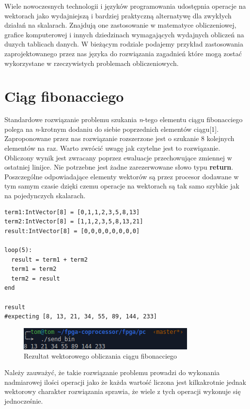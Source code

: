 Wiele nowoczesnych technologii i języków programowania udostępnia operacje na wektorach jako wydajniejszą i bardziej praktyczną alternatywę dla zwykłych działań na skalarach. Znajdują one zastosowanie w matematyce obliczeniowej, grafice komputerowej i innych dziedzinach wymagających wydajnych obliczeń na duzych tablicach danych. W bieżącym rodziale podajemy przykład zastosowania zaprojektowanego przez nas języka do rozwiązania zagadnień które mogą zostać wykorzystane w rzeczywistych problemach obliczeniowych.
\section{Ciąg fibonacciego}
Standardowe rozwiązanie problemu szukania \textit{n}-tego elementu ciągu fibonacciego polega na \textit{n}-krotnym dodaniu do siebie poprzednich elementów ciągu[1]. Zaproponowane przez nas rozwiązanie rozszerzone jest o szukanie 8 kolejnych elementów na raz. Warto zwrócić uwagę jak czytelne jest to rozwiązanie. Obliczony wynik jest zwracany poprzez ewaluacje przechowujące zmiennej w ostatniej linijce. Nie potrzebne jest żadne zarezerwowane słowo typu \textbf{return}. Poszczególne odpowiadające elementy wektorów są przez procesor dodawane w tym samym czasie dzięki czemu operacje na wektorach są tak samo szybkie jak na pojedynczych skalarach.\clearpage
\begin{lstlisting}[frame=single]
term1:IntVector[8] = [0,1,1,2,3,5,8,13]
term2:IntVector[8] = [1,1,2,3,5,8,13,21]
result:IntVector[8] = [0,0,0,0,0,0,0,0]

loop(5):
  result = term1 + term2
  term1 = term2
  term2 = result
end

result
#expecting [8, 13, 21, 34, 55, 89, 144, 233] 
\end{lstlisting}
\begin{figure}[H]
\centering
\includegraphics[scale=1]{images/fibb}
\caption{Rezultat wektorowego obliczania ciągu fibonacciego}
\end{figure}
Należy zauważyć, że takie rozwiązanie problemu prowadzi do wykonania nadmiarowej ilości operacji jako że każda wartość liczona jest kilkakrotnie jednak wektorowy charakter rozwiązania sprawia, że wiele z tych operacji wykonuje się jednocześnie.

